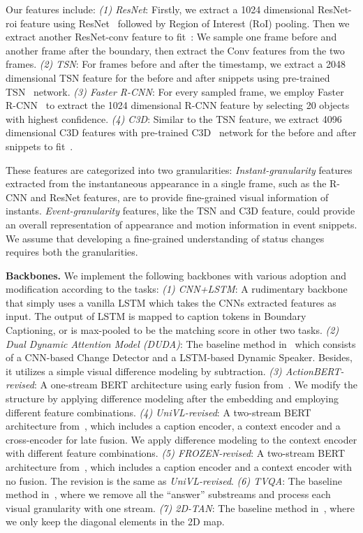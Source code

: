 \documentclass[runningheads]{llncs}
\begin{document}
Our features include: \textit{(1) ResNet}: Firstly, we extract a 1024 dimensional ResNet-roi feature using ResNet~\cite{he2016deep} followed by Region of Interest (RoI) pooling. Then we extract another ResNet-conv feature to fit~\cite{park2019robust}: We sample one frame before and another frame after the boundary, then extract the Conv features from the two frames. \textit{(2) TSN}: For frames before and after the timestamp, we extract a 2048 dimensional TSN feature for the before and after snippets using pre-trained TSN~\cite{wang2018temporal} network. \textit{(3) Faster R-CNN}: For every sampled frame, we employ Faster R-CNN~\cite{ren2015faster} to extract the 1024 dimensional R-CNN feature by selecting 20 objects with highest confidence. \textit{(4) C3D}: Similar to the TSN feature, we extract 4096 dimensional C3D features with pre-trained C3D~\cite{tran2015learning} network for the before and after snippets to fit~\cite{2DTAN_2020_AAAI}.

These features are categorized into two granularities: \textit{Instant-granularity} features extracted from the instantaneous appearance in a single frame, such as the R-CNN and ResNet features, are to provide fine-grained visual information of instants. \textit{Event-granularity} features, like the TSN and C3D feature, could provide an overall representation of appearance and motion information in event snippets. We assume that developing a fine-grained understanding of status changes requires both the granularities.


\textbf{Backbones.}
We implement the following backbones with various adoption and modification according to the tasks: 
\textit{(1) CNN+LSTM}: A rudimentary backbone that simply uses a vanilla LSTM which takes the CNNs extracted features as input. The output of LSTM is mapped to caption tokens in Boundary Captioning, or is max-pooled to be the matching score in other two tasks. 
\textit{(2) Dual Dynamic Attention Model (DUDA)}: The baseline method in~\cite{park2019robust} which consists of a CNN-based Change Detector and a LSTM-based Dynamic Speaker. Besides, it utilizes a simple visual difference modeling by subtraction. 
\textit{(3) ActionBERT-revised}: A one-stream BERT architecture using early fusion from~\cite{zhu2020actbert}. We modify the structure by applying difference modeling after the embedding and employing different feature combinations. 
\textit{(4) UniVL-revised}: A two-stream BERT architecture from~\cite{luo2020univl}, which includes a caption encoder, a context encoder and a cross-encoder for late fusion. We apply difference modeling to the context encoder with different feature combinations. 
\textit{(5) FROZEN-revised}: A two-stream BERT architecture from~\cite{bain2021frozen}, which includes a caption encoder and a context encoder with no fusion. The revision is the same as \textit{UniVL-revised}. 
\textit{(6) TVQA}: The baseline method in~\cite{lei2018tvqa}, where we remove all the “answer” substreams and process each visual granularity with one stream.
\textit{(7) 2D-TAN}: The baseline method in~\cite{2DTAN_2020_AAAI}, where we only keep the diagonal elements in the 2D map.
\end{document}
